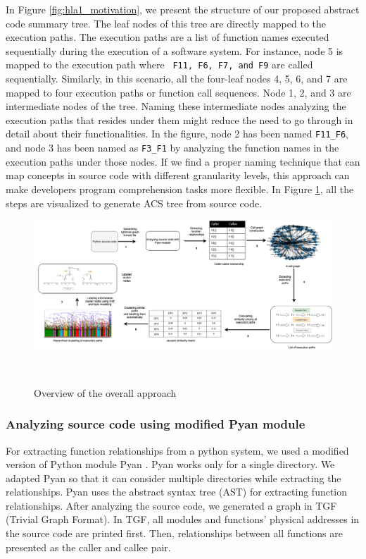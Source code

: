 In Figure \ref{fig:hla1_motivation}, we present the structure of our proposed abstract code summary tree. The leaf nodes of this tree are directly mapped to the execution paths. The execution paths are a list of function names executed sequentially during the execution of a software system. For instance, node 5 is mapped to the execution path where \texttt{ F11, F6, F7, and F9} are called sequentially. Similarly,  in this scenario, all the four-leaf nodes 4, 5, 6, and 7 are mapped to four execution paths or function call sequences. Node 1, 2, and 3 are intermediate nodes of the tree. Naming these intermediate nodes analyzing the execution paths that resides under them might reduce the need to go through in detail about their functionalities. In the figure, node 2 has been named \texttt{F11\_F6}, and node 3 has been named as \texttt{F3\_F1}  by analyzing the function names in the execution paths under those nodes. If we find a proper naming technique that can map concepts in source code with different granularity levels, this approach can make developers program comprehension tasks more flexible. In Figure \ref{hla1:fig:overall}, all the steps are visualized to generate ACS tree from source code.
  

\begin{figure}[tb]
  \centering
  \includegraphics[width=\columnwidth]{figures/hla1/visual_tool_static_call_graph.png}
  \caption{Overview of the overall approach}~\label{hla1:fig:overall}
\end{figure}

\subsubsection{Analyzing source code using modified Pyan module}

For extracting function relationships from a python system, we used a modified version of Python module Pyan \cite{pyan}. Pyan works only for a single directory. We adapted Pyan so that it can consider multiple directories while extracting the relationships. Pyan uses the abstract syntax tree (AST) for extracting function relationships. After analyzing the source code, we generated a graph in TGF (Trivial Graph Format). In TGF, all modules and functions' physical addresses in the source code are printed first. Then, relationships between all functions are presented as the caller and callee pair.

